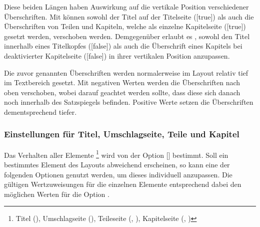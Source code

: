 \begin{Declaration}[v2.02]{}
\begin{Declaration}[v2.02]{}
\printdeclarationlist%
%
%
Diese beiden Längen haben Auswirkung auf die vertikale Position verschiedener
Überschriften. Mit  können sowohl der Titel auf der 
Titelseite ([true]) als auch die Überschriften von Teilen und 
Kapiteln, welche als einzelne Kapitelseite ([true]) gesetzt 
werden, verschoben werden. Demgegenüber erlaubt es , 
sowohl den Titel innerhalb eines Titelkopfes ([false]) als 
auch die Überschrift eines Kapitels bei deaktivierter Kapitelseite 
([false]) in ihrer vertikalen Position anzupassen.

Die zuvor genannten Überschriften werden normalerweise im Layout relativ tief 
im Textbereich gesetzt. Mit negativen Werten werden die Überschriften nach oben 
verschoben, wobei darauf geachtet werden sollte, dass diese sich danach noch 
innerhalb des Satzspiegels befinden. Positive Werte setzen die Überschriften 
dementsprechend tiefer.
\end{Declaration}
\end{Declaration}

\subsubsection{Einstellungen für Titel, Umschlagseite, Teile und Kapitel}
Das Verhalten aller Elemente%
\footnote{%
  Titel (), Umschlagseite (),
  Teileseite (, ),
  Kapitelseite (, )%
}
wird von der Option [\PSet] bestimmt. Soll ein bestimmtes Element 
des Layouts abweichend erscheinen, so kann eine der folgenden Optionen genutzt 
werden, um dieses individuell anzupassen. Die gültigen Wertzuweisungen für die 
einzelnen Elemente entsprechend dabei den möglichen Werten für die Option 
.

